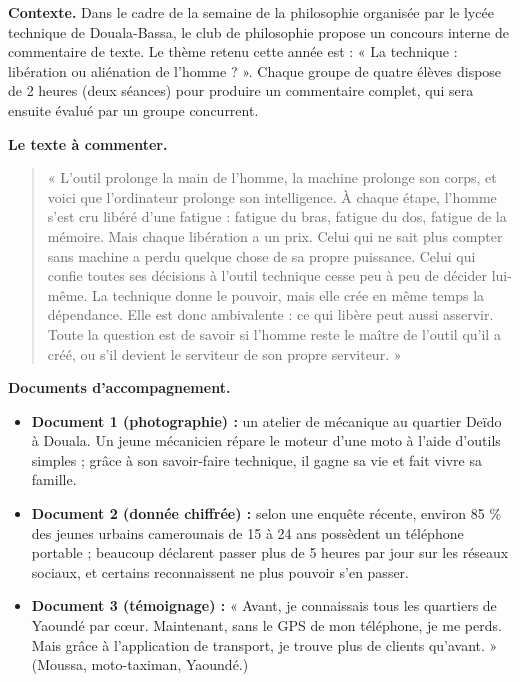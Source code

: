 \documentclass[11pt]{article}
\newcounter{popsec}
\newcounter{popsub}
\newcommand{\courssub}[1]{%
  \stepcounter{popsub}%
  \par\vspace{9pt}\noindent{\popxbold\fontsize{11.5}{13}\selectfont\color{popink}{\color{poporange}\thepopsec.\thepopsub}\hspace{6pt}#1}\par\nopagebreak\vspace{4pt}
}
\begin{document}
\courssub{Situation}

\textbf{Contexte.} Dans le cadre de la semaine de la philosophie organisée par le lycée technique de Douala-Bassa, le club de philosophie propose un concours interne de commentaire de texte. Le thème retenu cette année est : « La technique : libération ou aliénation de l'homme ? ». Chaque groupe de quatre élèves dispose de 2 heures (deux séances) pour produire un commentaire complet, qui sera ensuite évalué par un groupe concurrent.

\textbf{Le texte à commenter.}

\begin{quote}
« L'outil prolonge la main de l'homme, la machine prolonge son corps, et voici que l'ordinateur prolonge son intelligence. À chaque étape, l'homme s'est cru libéré d'une fatigue : fatigue du bras, fatigue du dos, fatigue de la mémoire. Mais chaque libération a un prix. Celui qui ne sait plus compter sans machine a perdu quelque chose de sa propre puissance. Celui qui confie toutes ses décisions à l'outil technique cesse peu à peu de décider lui-même. La technique donne le pouvoir, mais elle crée en même temps la dépendance. Elle est donc ambivalente : ce qui libère peut aussi asservir. Toute la question est de savoir si l'homme reste le maître de l'outil qu'il a créé, ou s'il devient le serviteur de son propre serviteur. »
\end{quote}

\textbf{Documents d'accompagnement.}

\begin{itemize}
\item \textbf{Document 1 (photographie) :} un atelier de mécanique au quartier Deïdo à Douala. Un jeune mécanicien répare le moteur d'une moto à l'aide d'outils simples ; grâce à son savoir-faire technique, il gagne sa vie et fait vivre sa famille.
\item \textbf{Document 2 (donnée chiffrée) :} selon une enquête récente, environ 85 \% des jeunes urbains camerounais de 15 à 24 ans possèdent un téléphone portable ; beaucoup déclarent passer plus de 5 heures par jour sur les réseaux sociaux, et certains reconnaissent ne plus pouvoir s'en passer.
\item \textbf{Document 3 (témoignage) :} « Avant, je connaissais tous les quartiers de Yaoundé par cœur. Maintenant, sans le GPS de mon téléphone, je me perds. Mais grâce à l'application de transport, je trouve plus de clients qu'avant. » (Moussa, moto-taximan, Yaoundé.)
\end{itemize}
\end{document}
